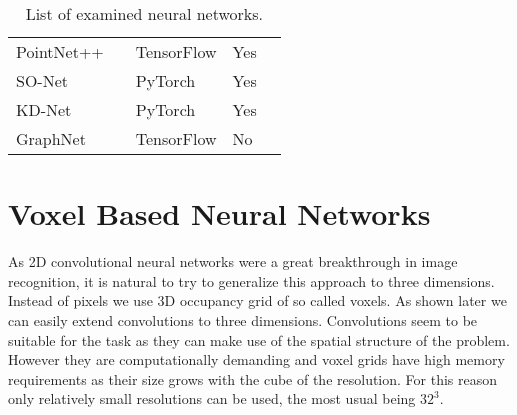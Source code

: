 \begin{table}[]
\begin{tabular}{lllll}
		PointNet++                  & \cite{qi_pointnet++:_2017}               & TensorFlow         & Yes               &  \\
		SO-Net                      & \cite{li_so-net:_2018}                   & PyTorch            & Yes               &  \\
		KD-Net                      & \cite{klokov_escape_2017}                & PyTorch            & Yes               &  \\
		GraphNet                    & \cite{dominguez_general-purpose_2018}    & TensorFlow         & No                &
	\end{tabular}
\caption{List of examined neural networks.}
\label{Table:1}
\end{table}

\section{Voxel Based Neural Networks}
As 2D convolutional neural networks were a great breakthrough in image recognition, it is natural to try to generalize this approach to three dimensions. Instead of pixels we use 3D occupancy grid of so called voxels. As shown later we can easily extend convolutions to three dimensions. Convolutions seem to be suitable for the task as they can make use of the spatial structure of the problem. However they are computationally demanding and voxel grids have high memory requirements as their size grows with the cube of the resolution. For this reason only relatively small resolutions can be used, the most usual being $32^3$. 

